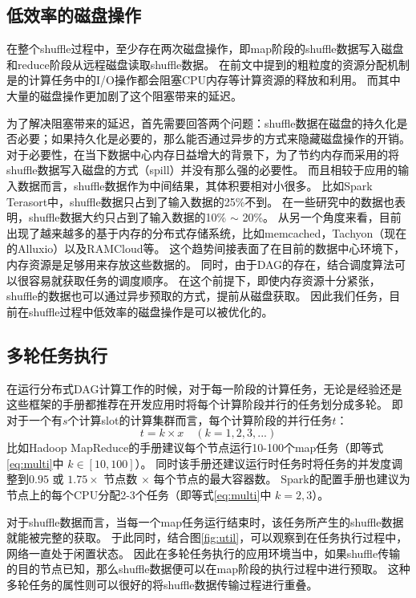 \subsection{低效率的磁盘操作}

在整个shuffle过程中，至少存在两次磁盘操作，即map阶段的shuffle数据写入磁盘和reduce阶段从远程磁盘读取shuffle数据。
在前文中提到的粗粒度的资源分配机制是的计算任务中的I/O操作都会阻塞CPU内存等计算资源的释放和利用。
而其中大量的磁盘操作更加剧了这个阻塞带来的延迟。

为了解决阻塞带来的延迟，首先需要回答两个问题：shuffle数据在磁盘的持久化是否必要；如果持久化是必要的，那么能否通过异步的方式来隐藏磁盘操作的开销。
对于必要性，在当下数据中心内存日益增大的背景下，为了节约内存而采用的将shuffle数据写入磁盘的方式（spill）并没有那么强的必要性。
而且相较于应用的输入数据而言，shuffle数据作为中间结果，其体积要相对小很多。
比如Spark Terasort\cite{spark-tera}中，shuffle数据只占到了输入数据的25\%不到。
在一些研究中\cite{makingsense}的数据也表明，shuffle数据大约只占到了输入数据的10\% $\sim$ 20\%。
从另一个角度来看，目前出现了越来越多的基于内存的分布式存储系统，比如memcached\cite{memcached}，Tachyon\cite{tachyon}（现在的Alluxio\cite{alluxio}）以及RAMCloud\cite{ramcloud}等。
这个趋势间接表面了在目前的数据中心环境下，内存资源是足够用来存放这些数据的。
同时，由于DAG的存在，结合调度算法可以很容易就获取任务的调度顺序。
在这个前提下，即使内存资源十分紧张，shuffle的数据也可以通过异步预取的方式，提前从磁盘获取。
因此我们任务，目前在shuffle过程中低效率的磁盘操作是可以被优化的。

\subsection{多轮任务执行}

在运行分布式DAG计算工作的时候，对于每一阶段的计算任务，无论是经验还是这些框架的手册都推荐在开发应用时将每个计算阶段并行的任务划分成多轮。
即对于一个有$s$个计算slot的计算集群而言，每个计算阶段的并行任务$t$：
\begin{equation}
	\label{eq:multi}
	t = k \times x \quad (k = 1, 2, 3, ...)
\end{equation}
比如Hadoop MapReduce的手册\cite{hadooptutorial}建议每个节点运行10-100个map任务（即等式\ref{eq:multi}中 $k \in [10, 100]$）。
同时该手册还建议运行时任务时将任务的并发度调整到$0.95$ 或 $1.75 \times$ 节点数 $\times$ 每个节点的最大容器数。
Spark的配置手册\cite{sparkconf}也建议为节点上的每个CPU分配2-3个任务（即等式\ref{eq:multi}中 $k = 2, 3$）。

对于shuffle数据而言，当每一个map任务运行结束时，该任务所产生的shuffle数据就能被完整的获取。
于此同时，结合图\ref{fig:util}，可以观察到在任务执行过程中，网络一直处于闲置状态。
因此在多轮任务执行的应用环境当中，如果shuffle传输的目的节点已知，那么shuffle数据便可以在map阶段的执行过程中进行预取。
这种多轮任务的属性则可以很好的将shuffle数据传输过程进行重叠。

